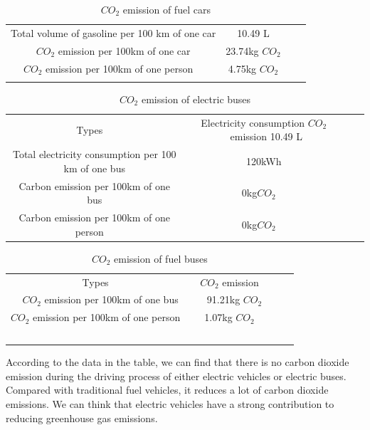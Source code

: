 \documentclass{apmcmthesis}
\begin{document}
\begin{table}
\centering
\begin{tabular}{ccll} 
\cline{1-2}
Total volume of gasoline per 100 km of one car & 10.49 L              &  &   \\ 
\cline{1-2}
$CO_2$ emission per 100km of one car              & 23.74kg $CO_2$           &  &   \\
$CO_2$ emission per 100km of one person~~         & 4.75kg $CO_2$            &  &   \\ 
\cline{1-2}
\multicolumn{1}{l}{}                           & \multicolumn{1}{l}{} &  &  
\end{tabular}
\caption{$CO_2$ emission of fuel cars}
\end{table}

\begin{table}
\centering
\begin{tabular}{ccll} 
\cline{1-2}
Types~~                                             & Electricity consumption  $CO_2$~emission 10.49 L &  &   \\ 
\cline{1-2}
Total electricity consumption per 100 km of one bus & 120kWh                                        &  &   \\
Carbon emission per 100km of one bus                & 0kg$CO_2$~~                                      &  &   \\
Carbon emission per 100km of one person~~           & 0kg$CO_2$~~                                      &  &   \\
\cline{1-2}
\end{tabular}
\caption{$CO_2$ emission of electric buses}
\end{table}

\begin{table}
\centering
\begin{tabular}{ccll} 
\cline{1-2}
Types~~                                & $CO_2$ emission~~       &  &   \\ 
\cline{1-2}
$CO_2$ emission per 100km of one bus      & 91.21kg $CO_2$          &  &   \\
$CO_2$ emission per 100km of one person~~ & 1.07kg $CO_2$~~         &  &   \\ 
\cline{1-2}
\multicolumn{1}{c}{~}                  & \multicolumn{1}{c}{} &  &  
\end{tabular}
\caption{$CO_2$ emission of fuel buses}
\end{table}

According to the data in the table, we can find that there is no carbon dioxide emission during the driving process of either electric vehicles or electric buses. Compared with traditional fuel vehicles, it reduces a lot of carbon dioxide emissions. We can think that electric vehicles have a strong contribution to reducing greenhouse gas emissions.
\end{document}
